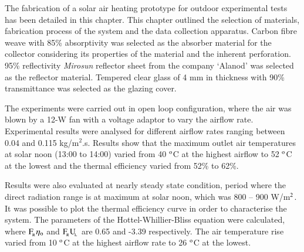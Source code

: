 The fabrication of a solar air heating prototype for outdoor experimental tests has been detailed in this chapter. This chapter outlined the selection of materials, fabrication process of the system and the data collection apparatus. Carbon fibre weave with 85\% absorptivity was selected as the absorber material for the collector considering its properties of the material and the inherent perforation. 95\% reflectivity \textit{Mirosun} reflector sheet from the company ‘Alanod’ was selected as the reflector material. Tempered clear glass of 4 mm in thickness with 90\% transmittance was selected as the glazing cover.

The experiments were carried out in open loop configuration, where the air was blown by a 12-W fan with a voltage adaptor to vary the airflow rate. Experimental results were analysed for different airflow rates ranging between 0.04 and 0.115 kg/m$^2$.s. Results show that the maximum outlet air temperatures at solar noon (13:00 to 14:00) varied from 40 $^{\rm{o}}$C at the highest airflow to 52 $^{\rm{o}}$C at the lowest and the thermal efficiency varied from 52\% to 62\%. 

Results were also evaluated at nearly steady state condition, period where the direct radiation range is at maximum at solar noon, which was 800 -- 900 W/m$^{\rm{2}}$. It was possible to plot the thermal efficiency curve in order to characterise the system. The parameters of the Hottel-Whillier-Bliss equation were calculated, where $\rm{F_{\!_R}}\eta_{\rm{o}}$ and $\rm{F_{\!_R}{U_{\!_L}}}$ are 0.65 and -3.39 respectively. The air temperature rise varied from 10 $^{\rm{o}}$C at the highest airflow rate to 26 $^{\rm{o}}$C at the lowest.






